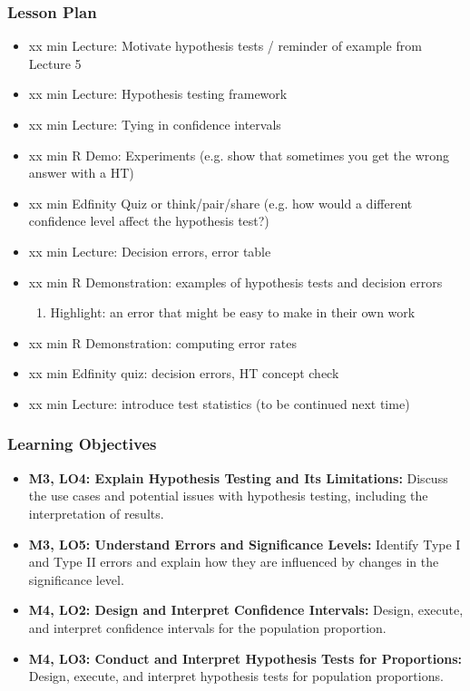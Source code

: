 \begin{frame}
    \frametitle{Lesson Plan}
    \begin{itemize}
        \item xx min Lecture: Motivate hypothesis tests / reminder of example from Lecture 5
        \item xx min Lecture: Hypothesis testing framework
        \item xx min Lecture: Tying in confidence intervals
        \item xx min R Demo: Experiments (e.g. show that sometimes you get the wrong answer with a HT)
        \item xx min Edfinity Quiz or think/pair/share (e.g. how would a different confidence level affect the hypothesis test?)
        \item xx min Lecture: Decision errors, error table
        \item xx min R Demonstration: examples of hypothesis tests and decision errors
        \begin{enumerate}
            \item Highlight: an error that might be easy to make in their own work
        \end{enumerate}
        \item xx min R Demonstration: computing error rates
        \item xx min Edfinity quiz: decision errors, HT concept check
        \item xx min Lecture: introduce test statistics (to be continued next time)
    \end{itemize}
\end{frame}
            
\begin{frame}
    \frametitle{Learning Objectives}
    \begin{itemize}
        \item \textbf{M3, LO4: Explain Hypothesis Testing and Its Limitations:} Discuss the use cases and potential issues with hypothesis testing, including the interpretation of results.
        \item \textbf{M3, LO5: Understand Errors and Significance Levels:} Identify Type I and Type II errors and explain how they are influenced by changes in the significance level.
        \item \textbf{M4, LO2: Design and Interpret Confidence Intervals:} Design, execute, and interpret confidence intervals for the population proportion.
        \item \textbf{M4, LO3: Conduct and Interpret Hypothesis Tests for Proportions:} Design, execute, and interpret hypothesis tests for population proportions.
    \end{itemize}
\end{frame}
    
